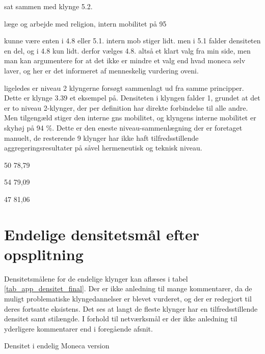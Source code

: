  sat sammen med klynge 5.2. 


læge og arbejde med religion, intern mobilitet på 95 %


 kunne være enten i 4.8 eller 5.1. intern mob stiger lidt. men i 5.1 falder densiteten en del, og i 4.8 kun lidt. derfor vælges 4.8. altså et klart valg fra min side, men man kan argumentere for at det ikke er mindre et valg end hvad moneca selv laver, og her er det informeret af menneskelig vurdering oveni. 


ligeledes er niveau 2 klyngerne forsøgt sammenlagt ud fra samme principper. 
  Dette er klynge 3.39 et eksempel på. Densiteten i klyngen falder 1, grundet at det er to niveau 2-klynger, der per definition har direkte forbindelse til alle andre. Men tilgengæld stiger den interne gns mobilitet, og klyngens interne mobilitet er skyhøj på 94 \%. Dette er den eneste niveau-sammenlægning der er foretaget manuelt, de resterende 9 klynger har ikke haft tilfredsstillende aggregeringsresultater på såvel hermeneutisk og teknisk niveau.  
  



50 78,79 %

54 79,09 %

47 81,06 %





%
\section{Endelige densitetsmål efter opsplitning}
%

Densitetsmålene for de endelige klynger kan aflæses i tabel \ref{tab_app_densitet_final}. Der er ikke anledning til mange kommentarer, da de muligt problematiske klyngedannelser er blevet vurderet, og der er redegjort til deres fortsatte eksistens. Det ses at langt de fleste klynger har en tilfredsstillende densitet samt stilængde. I forhold til netværksmål er der ikke anledning til yderligere kommentarer end i foregående afsnit. 
%
\begin{table}[H]
  \centering
    \resizebox{5cm}{!}{%

}
  \caption{Densitet i endelig Moneca version}
  \label{tab_app_densitet_final}%
\end{table}
%
